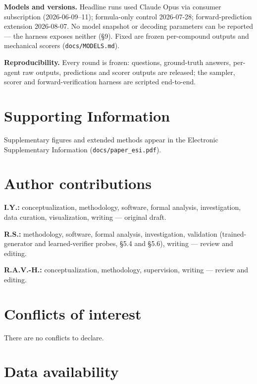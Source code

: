 \documentclass[
  10pt,
]{article}
\begin{document}
\textbf{Models and versions.} Headline runs used Claude Opus via
consumer subscription (2026-06-09--11); formula-only control 2026-07-28;
forward-prediction extension 2026-08-07. No model snapshot or decoding
parameters can be reported --- the harness exposes neither (§9). Fixed
are frozen per-compound outputs and mechanical scorers
(\texttt{docs/\hspace{0pt}MODELS.md}).

\textbf{Reproducibility.} Every round is frozen: questions, ground-truth
answers, per-agent raw outputs, predictions and scorer outputs are
released; the sampler, scorer and forward-verification harness are
scripted end-to-end.

\FloatBarrier
\hypertarget{supporting-information}{%
\section{Supporting Information}\label{supporting-information}}

Supplementary figures and extended methods appear in the Electronic
Supplementary Information (\texttt{docs/\hspace{0pt}paper\_esi.pdf}).

\FloatBarrier
\hypertarget{author-contributions}{%
\section{Author contributions}\label{author-contributions}}

\textbf{I.Y.:} conceptualization, methodology, software, formal
analysis, investigation, data curation, visualization, writing ---
original draft.

\textbf{R.S.:} methodology, software, formal analysis, investigation,
validation (trained-generator and learned-verifier probes, §5.4 and
§5.6), writing --- review and editing.

\textbf{R.A.V.-H.:} conceptualization, methodology, supervision, writing
--- review and editing.

\FloatBarrier
\hypertarget{conflicts-of-interest}{%
\section{Conflicts of interest}\label{conflicts-of-interest}}

There are no conflicts to declare.

\FloatBarrier
\hypertarget{data-availability}{%
\section{Data availability}\label{data-availability}}
\end{document}
